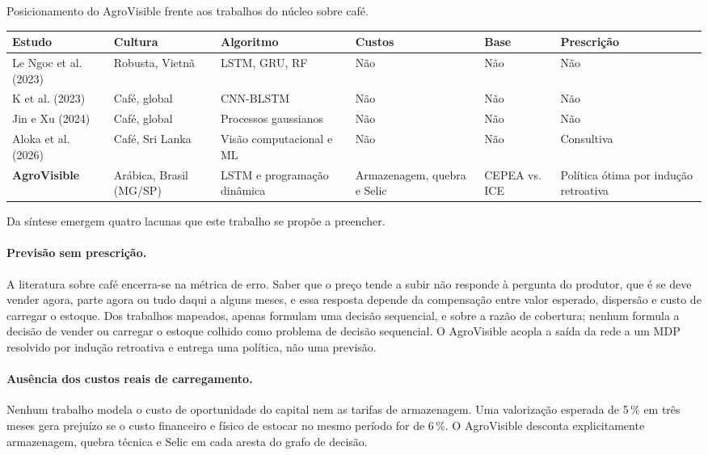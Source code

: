 \begin{quadro}[htb]
	\centering
	\caption{Posicionamento do AgroVisible frente aos trabalhos do núcleo sobre café.}\label{qua:lacuna}
	\small
	\begin{tabular}{L{2.6cm} L{2.2cm} L{2.5cm} L{1.9cm} L{1.6cm} L{2.6cm}}
		\hline
		\textbf{Estudo} & \textbf{Cultura} & \textbf{Algoritmo} & \textbf{Custos} & \textbf{Base} & \textbf{Prescrição} \\ \hline
		Le Ngoc et al. (2023) & Robusta, Vietnã & LSTM, GRU, RF & Não & Não & Não \\
		K et al. (2023) & Café, global & CNN-BLSTM & Não & Não & Não \\
		Jin e Xu (2024) & Café, global & Processos gaussianos & Não & Não & Não \\
		Aloka et al. (2026) & Café, Sri Lanka & Visão computacional e ML & Não & Não & Consultiva \\
		\textbf{AgroVisible} & Arábica, Brasil (MG/SP) & LSTM e programação dinâmica & Armazenagem, quebra e Selic & CEPEA vs. ICE & Política ótima por indução retroativa \\ \hline
	\end{tabular}
\end{quadro}

Da síntese emergem quatro lacunas que este trabalho se propõe a preencher.

\paragraph{Previsão sem prescrição.} A literatura sobre café encerra-se na métrica de erro. Saber que o preço tende a subir não responde à pergunta do produtor, que é se deve vender agora, parte agora ou tudo daqui a alguns meses, e essa resposta depende da compensação entre valor esperado, dispersão e custo de carregar o estoque. Dos trabalhos mapeados, apenas  formulam uma decisão sequencial, e sobre a razão de cobertura; nenhum formula a decisão de vender ou carregar o estoque colhido como problema de decisão sequencial. O AgroVisible acopla a saída da rede a um MDP resolvido por indução retroativa e entrega uma política, não uma previsão.

\paragraph{Ausência dos custos reais de carregamento.} Nenhum trabalho modela o custo de oportunidade do capital nem as tarifas de armazenagem. Uma valorização esperada de 5\,\% em três meses gera prejuízo se o custo financeiro e físico de estocar no mesmo período for de 6\,\%. O AgroVisible desconta explicitamente armazenagem, quebra técnica e Selic em cada aresta do grafo de decisão.

